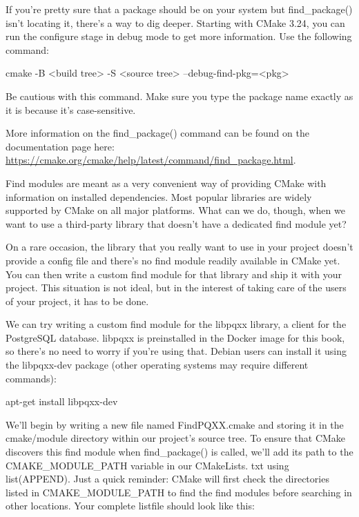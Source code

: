 If you’re pretty sure that a package should be on your system but find\_package() isn’t locating it, there’s a way to dig deeper. Starting with CMake 3.24, you can run the configure stage in debug mode to get more information. Use the following command:

\begin{shell}
cmake -B <build tree> -S <source tree> --debug-find-pkg=<pkg>
\end{shell}

Be cautious with this command. Make sure you type the package name exactly as it is because it’s case-sensitive.

More information on the find\_package() command can be found on the documentation page here: \url{https://cmake.org/cmake/help/latest/command/find_package.html}.

Find modules are meant as a very convenient way of providing CMake with information on installed dependencies. Most popular libraries are widely supported by CMake on all major platforms. What can we do, though, when we want to use a third-party library that doesn’t have a dedicated find module yet?


On a rare occasion, the library that you really want to use in your project doesn’t provide a config file and there’s no find module readily available in CMake yet. You can then write a custom find module for that library and ship it with your project. This situation is not ideal, but in the interest of taking care of the users of your project, it has to be done.

We can try writing a custom find module for the libpqxx library, a client for the PostgreSQL database. libpqxx is preinstalled in the Docker image for this book, so there’s no need to worry if you’re using that. Debian users can install it using the libpqxx-dev package (other operating systems may require different commands):

\begin{shell}
apt-get install libpqxx-dev
\end{shell}

We’ll begin by writing a new file named FindPQXX.cmake and storing it in the cmake/module directory within our project’s source tree. To ensure that CMake discovers this find module when find\_package() is called, we’ll add its path to the CMAKE\_MODULE\_PATH variable in our CMakeLists. txt using list(APPEND). Just a quick reminder: CMake will first check the directories listed in CMAKE\_MODULE\_PATH to find the find modules before searching in other locations. Your complete listfile should look like this:


